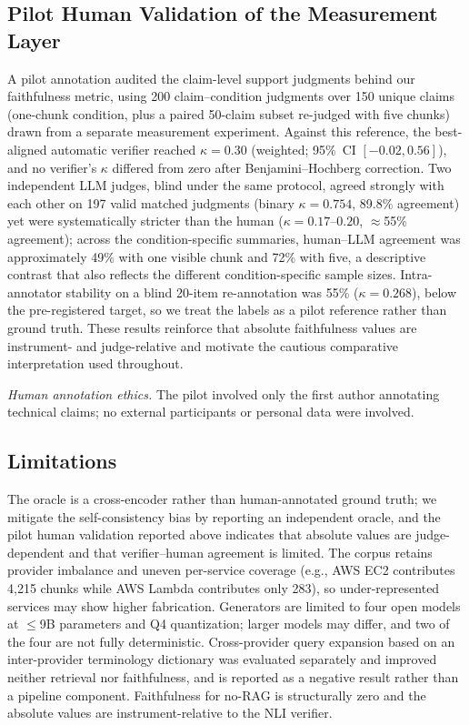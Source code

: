 \documentclass[conference]{IEEEtran}
\begin{document}
\subsection{Pilot Human Validation of the Measurement Layer}
A pilot annotation audited the claim-level support judgments behind our faithfulness metric, using 200 claim--condition judgments over 150 unique claims (one-chunk condition, plus a paired 50-claim subset re-judged with five chunks) drawn from a separate measurement experiment. Against this reference, the best-aligned automatic verifier reached $\kappa=0.30$ (weighted; 95\%~CI $[-0.02,0.56]$), and no verifier's $\kappa$ differed from zero after Benjamini--Hochberg correction. Two independent LLM judges, blind under the same protocol, agreed strongly with each other on 197 valid matched judgments (binary $\kappa=0.754$, 89.8\% agreement) yet were systematically stricter than the human ($\kappa=0.17$--$0.20$, $\approx$55\% agreement); across the condition-specific summaries, human--LLM agreement was approximately 49\% with one visible chunk and 72\% with five, a descriptive contrast that also reflects the different condition-specific sample sizes. Intra-annotator stability on a blind 20-item re-annotation was 55\% ($\kappa=0.268$), below the pre-registered target, so we treat the labels as a pilot reference rather than ground truth. These results reinforce that absolute faithfulness values are instrument- and judge-relative and motivate the cautious comparative interpretation used throughout.
\par\textit{Human annotation ethics.} The pilot involved only the first author annotating technical claims; no external participants or personal data were involved.
\subsection{Limitations}
The oracle is a cross-encoder rather than human-annotated ground truth; we mitigate the self-consistency bias by reporting an independent oracle, and the pilot human validation reported above indicates that absolute values are judge-dependent and that verifier--human agreement is limited. The corpus retains provider imbalance and uneven per-service coverage (e.g., AWS EC2 contributes 4{,}215 chunks while AWS Lambda contributes only 283), so under-represented services may show higher fabrication. Generators are limited to four open models at $\leq$9B parameters and Q4 quantization; larger models may differ, and two of the four are not fully deterministic. Cross-provider query expansion based on an inter-provider terminology dictionary was evaluated separately and improved neither retrieval nor faithfulness, and is reported as a negative result rather than a pipeline component. Faithfulness for no-RAG is structurally zero and the absolute values are instrument-relative to the NLI verifier.
\end{document}
